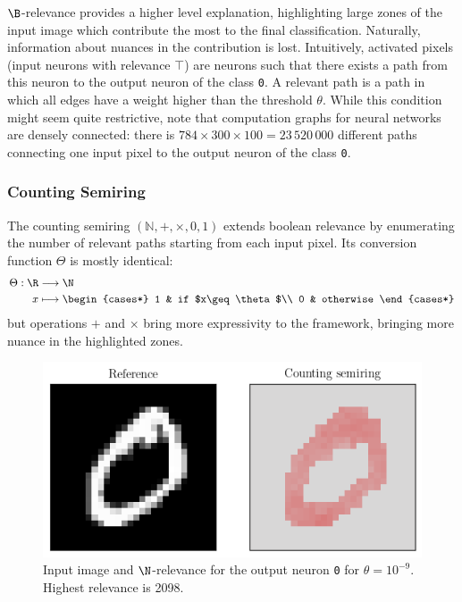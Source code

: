 \documentclass{../cs-classes/cs-classes}
\newcommand*{\1}{\digitsbb{1}}
\newcommand*{\0}{\digitsbb{0}}
\begin{document}
$\B$-relevance provides a higher level explanation, highlighting large zones of the input image which contribute the most to the final classification.
Naturally, information about nuances in the contribution is lost. Intuitively, activated pixels (input neurons with relevance $\top$) are neurons such that there exists a  path from this neuron to the output neuron of the class \texttt{0}. A relevant path is a path in which all edges have a weight higher than the threshold $\theta$. While this condition might seem quite restrictive, note that computation graphs for neural networks are densely connected: there is $784\times300\times100=23\,520\,000$ different paths connecting one input pixel to the output neuron of the class \texttt{0}.

\subsubsection{Counting Semiring}
The counting semiring $(\mathbb{N}, +, \times, 0, 1)$ extends boolean relevance by enumerating the number of relevant paths starting from each input pixel. Its conversion function $\Theta$ is mostly identical:
\begin{equation}
    \begin{aligned}
        \Theta: \R&\longrightarrow\N\\
        x&\longmapsto \begin{cases*}
            1 & if $x\geq\theta$\\
            0 & otherwise
        \end{cases*}
    \end{aligned}
\end{equation}
but operations $+$ and $\times$ bring more expressivity to the framework, bringing more nuance in the highlighted zones.

\begin{figure}[H]
    \centering
    \includegraphics[width=.5\textwidth]{counting.png}
    \caption{Input image and $\N$-relevance for the output neuron \texttt{0} for $\theta=10^{-9}$.\\ Highest relevance is 2098.}
\end{figure}
\end{document}
